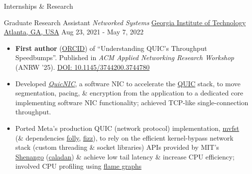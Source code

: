 \documentclass[]{mcdowellcv}
\begin{document}
\begin{cvsection}{Internships \& Research}
  \begin{cvsubsection}
    {Graduate Research Assistant \linebreak \textit{Networked Systems}}
    {\href{https://scs.gatech.edu/}{Georgia Institute of Technology \linebreak Atlanta, GA, USA}}
    {Aug 23, 2021 - May 7, 2022}
    \begin{itemize}
      \item
            \textbf{First author}
            (\href{https://orcid.org/0009-0002-9353-7810}{ORCID}) of
            ``Understanding QUIC's Throughput Speedbumps''. Published in
            \textit{ACM Applied Networking Research Workshop} (ANRW '25).
            \href{https://doi.org/10.1145/3744200.3744780}{DOI:
            10.1145/3744200.3744780}
      \item
            Developed
            \href{https://github.com/saubhik/caladan/pulls}{\textit{QuicNIC}},
            a software NIC to accelerate the \href{https://quicwg.org/}{QUIC}
            stack, to move segmentation, pacing, \& encryption from the
            application to a dedicated core implementing software NIC
            functionality; achieved TCP-like single-connection throughput.
      \item
            Ported Meta's production QUIC (network protocol) implementation,
            \href{https://github.com/facebookincubator/mvfst}{mvfst} (\&
            dependencies \href{https://github.com/facebook/folly}{folly},
            \href{https://github.com/facebookincubator/fizz}{fizz}), to rely on
            the efficient kernel-bypass network stack (custom threading \&
            socket libraries) APIs provided by MIT's
            \href{https://www.usenix.org/conference/nsdi19/presentation/ousterhout}{Shenango}
            (\href{https://github.com/shenango/caladan}{caladan}) \& achieve
            low tail latency \& increase CPU efficiency; involved CPU profiling
            using
            \href{https://www.brendangregg.com/FlameGraphs/cpuflamegraphs.html}{flame
            graphs}
    \end{itemize}
  \end{cvsubsection}


\end{cvsection}
\end{document}
